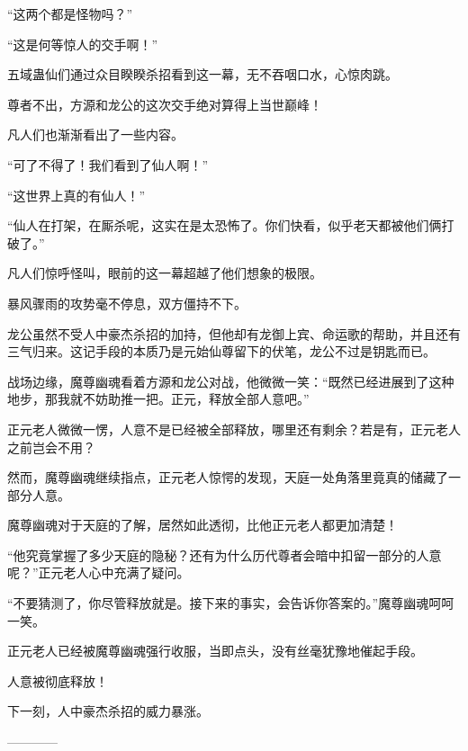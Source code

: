 \begin{this_body}
“这两个都是怪物吗？”

“这是何等惊人的交手啊！”

五域蛊仙们通过众目睽睽杀招看到这一幕，无不吞咽口水，心惊肉跳。

尊者不出，方源和龙公的这次交手绝对算得上当世巅峰！

凡人们也渐渐看出了一些内容。

“可了不得了！我们看到了仙人啊！”

“这世界上真的有仙人！”

“仙人在打架，在厮杀呢，这实在是太恐怖了。你们快看，似乎老天都被他们俩打破了。”

凡人们惊呼怪叫，眼前的这一幕超越了他们想象的极限。

暴风骤雨的攻势毫不停息，双方僵持不下。

龙公虽然不受人中豪杰杀招的加持，但他却有龙御上宾、命运歌的帮助，并且还有三气归来。这记手段的本质乃是元始仙尊留下的伏笔，龙公不过是钥匙而已。

战场边缘，魔尊幽魂看着方源和龙公对战，他微微一笑：“既然已经进展到了这种地步，那我就不妨助推一把。正元，释放全部人意吧。”

正元老人微微一愣，人意不是已经被全部释放，哪里还有剩余？若是有，正元老人之前岂会不用？

然而，魔尊幽魂继续指点，正元老人惊愕的发现，天庭一处角落里竟真的储藏了一部分人意。

魔尊幽魂对于天庭的了解，居然如此透彻，比他正元老人都更加清楚！

“他究竟掌握了多少天庭的隐秘？还有为什么历代尊者会暗中扣留一部分的人意呢？”正元老人心中充满了疑问。

“不要猜测了，你尽管释放就是。接下来的事实，会告诉你答案的。”魔尊幽魂呵呵一笑。

正元老人已经被魔尊幽魂强行收服，当即点头，没有丝毫犹豫地催起手段。

人意被彻底释放！

下一刻，人中豪杰杀招的威力暴涨。

------------

\end{this_body}

